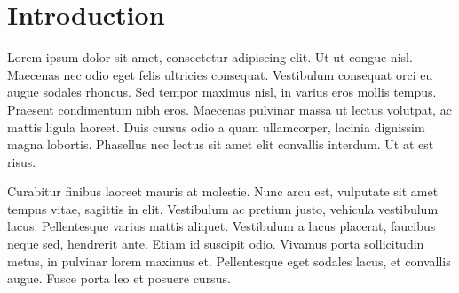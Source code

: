 \section{Introduction}\label{introduction}

Lorem ipsum dolor sit amet, consectetur adipiscing elit. Ut ut congue nisl. Maecenas nec odio eget felis ultricies consequat. Vestibulum consequat orci eu augue sodales rhoncus. Sed tempor maximus nisl, in varius eros mollis tempus. Praesent condimentum nibh eros. Maecenas pulvinar massa ut lectus volutpat, ac mattis ligula laoreet. Duis cursus odio a quam ullamcorper, lacinia dignissim magna lobortis. Phasellus nec lectus sit amet elit convallis interdum. Ut at est risus.

Curabitur finibus laoreet mauris at molestie. Nunc arcu est, vulputate sit amet tempus vitae, sagittis in elit. Vestibulum ac pretium justo, vehicula vestibulum lacus. Pellentesque varius mattis aliquet. Vestibulum a lacus placerat, faucibus neque sed, hendrerit ante. Etiam id suscipit odio. Vivamus porta sollicitudin metus, in pulvinar lorem maximus et. Pellentesque eget sodales lacus, et convallis augue. Fusce porta leo et posuere cursus.
